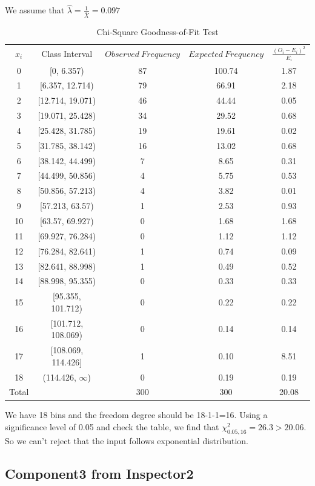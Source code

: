 \documentclass{article}
\begin{document}
We assume that $\hat{\lambda}=\frac{1}{\bar{X}}=0.097$
\begin{table}[htp]
\caption{Chi-Square Goodness-of-Fit Test}
\begin{center}
\begin{tabular}{ccccc}
\hline
$x_i$ & Class Interval & $Observed\ Frequency$ & $Expected\ Frequency$ & $\frac{(O_i-E_i)^2}{E_i}$\\
0& [0, 6.357)&87&100.74&1.87\\
1& [6.357, 12.714)&79&66.91&2.18\\
2&[12.714, 19.071)&46&44.44&0.05\\
3& [19.071, 25.428)&34&29.52&0.68\\
4&[25.428, 31.785)&19&19.61&0.02\\
5&[31.785, 38.142)&16&13.02&0.68\\
6&[38.142, 44.499)&7&8.65&0.31\\
7&[44.499, 50.856)&4&5.75&0.53\\
8&[50.856, 57.213)&4&3.82&0.01\\
9&[57.213, 63.57)&1&2.53&0.93\\
10&[63.57, 69.927)&0&1.68&1.68\\
11&[69.927, 76.284)&0&1.12&1.12\\
12&[76.284, 82.641)&1&0.74&0.09\\
13&[82.641, 88.998)&1&0.49&0.52\\
14&[88.998, 95.355)&0&0.33&0.33\\
15&[95.355, 101.712)&0&0.22&0.22\\
16&[101.712, 108.069)&0&0.14&0.14\\
17&[108.069, 114.426]&1&0.10&8.51\\
18& (114.426, $\infty$)&0&0.19&0.19\\
\hline
Total& &300&300&20.08\\

\hline

\end{tabular}
\end{center}
\label{default}
\end{table}%

We have 18 bins and the freedom degree should be 18-1-1=16. Using a significance level of 0.05 and check the table, we find that $\chi^2_{0.05, 16}=26.3 > 20.06$. So we can't reject that the input follows exponential distribution.

\subsection{Component3 from Inspector2}
\end{document}
